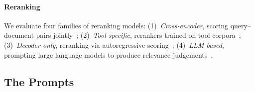 \documentclass{article} %
\begin{document}
\paragraph{Reranking} We evaluate four families of reranking models:
(1)~\textit{Cross-encoder}, scoring query--document pairs jointly~\cite{wang2021minilmv2, rerank2024mxbai, multi2024m3};
(2)~\textit{Tool-specific}, rerankers trained on tool corpora~\cite{zheng2403toolrerank};
(3)~\textit{Decoder-only}, reranking via autoregressive scoring~\cite{nogueira2020document, qwen3embedding};
(4)~\textit{LLM-based}, prompting large language models to produce relevance judgements~\cite{sun2023chatgpt}.

\subsection{The Prompts}
\end{document}
